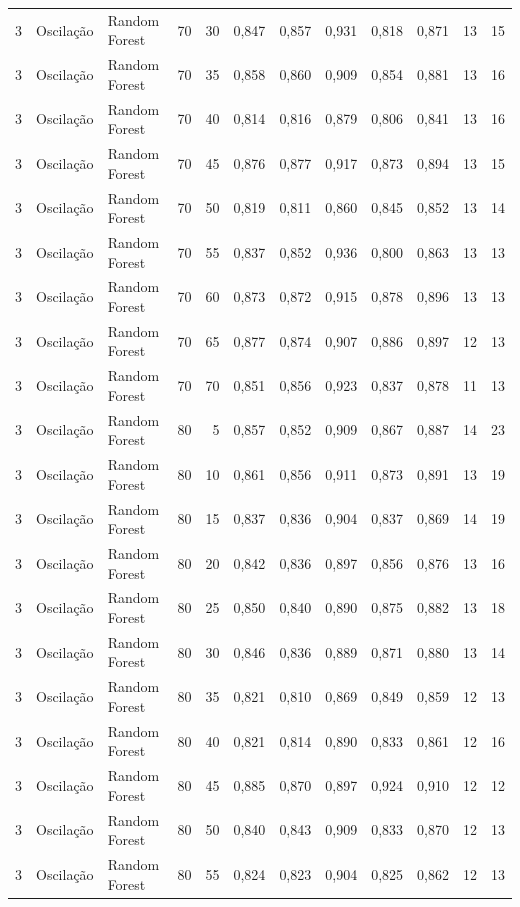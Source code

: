 \begin{longtable}{@{}rllrrrrrrrrr@{}}
3 & Oscilação & Random Forest & 70 & 30 & 0,847 & 0,857 & 0,931 & 0,818 & 0,871 & 13 & 15 \\
3 & Oscilação & Random Forest & 70 & 35 & 0,858 & 0,860 & 0,909 & 0,854 & 0,881 & 13 & 16 \\
3 & Oscilação & Random Forest & 70 & 40 & 0,814 & 0,816 & 0,879 & 0,806 & 0,841 & 13 & 16 \\
3 & Oscilação & Random Forest & 70 & 45 & 0,876 & 0,877 & 0,917 & 0,873 & 0,894 & 13 & 15 \\
3 & Oscilação & Random Forest & 70 & 50 & 0,819 & 0,811 & 0,860 & 0,845 & 0,852 & 13 & 14 \\
3 & Oscilação & Random Forest & 70 & 55 & 0,837 & 0,852 & 0,936 & 0,800 & 0,863 & 13 & 13 \\
3 & Oscilação & Random Forest & 70 & 60 & 0,873 & 0,872 & 0,915 & 0,878 & 0,896 & 13 & 13 \\
3 & Oscilação & Random Forest & 70 & 65 & 0,877 & 0,874 & 0,907 & 0,886 & 0,897 & 12 & 13 \\
3 & Oscilação & Random Forest & 70 & 70 & 0,851 & 0,856 & 0,923 & 0,837 & 0,878 & 11 & 13 \\
3 & Oscilação & Random Forest & 80 & 5 & 0,857 & 0,852 & 0,909 & 0,867 & 0,887 & 14 & 23 \\
3 & Oscilação & Random Forest & 80 & 10 & 0,861 & 0,856 & 0,911 & 0,873 & 0,891 & 13 & 19 \\
3 & Oscilação & Random Forest & 80 & 15 & 0,837 & 0,836 & 0,904 & 0,837 & 0,869 & 14 & 19 \\
3 & Oscilação & Random Forest & 80 & 20 & 0,842 & 0,836 & 0,897 & 0,856 & 0,876 & 13 & 16 \\
3 & Oscilação & Random Forest & 80 & 25 & 0,850 & 0,840 & 0,890 & 0,875 & 0,882 & 13 & 18 \\
3 & Oscilação & Random Forest & 80 & 30 & 0,846 & 0,836 & 0,889 & 0,871 & 0,880 & 13 & 14 \\
3 & Oscilação & Random Forest & 80 & 35 & 0,821 & 0,810 & 0,869 & 0,849 & 0,859 & 12 & 13 \\
3 & Oscilação & Random Forest & 80 & 40 & 0,821 & 0,814 & 0,890 & 0,833 & 0,861 & 12 & 16 \\
3 & Oscilação & Random Forest & 80 & 45 & 0,885 & 0,870 & 0,897 & 0,924 & 0,910 & 12 & 12 \\
3 & Oscilação & Random Forest & 80 & 50 & 0,840 & 0,843 & 0,909 & 0,833 & 0,870 & 12 & 13 \\
3 & Oscilação & Random Forest & 80 & 55 & 0,824 & 0,823 & 0,904 & 0,825 & 0,862 & 12 & 13 \\

\end{longtable}
